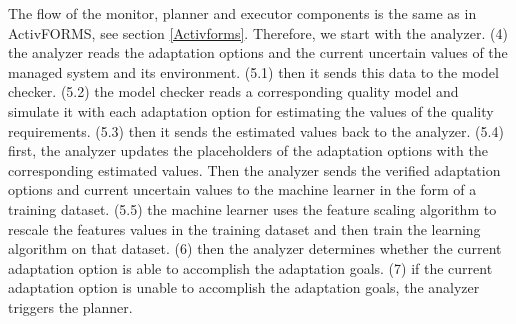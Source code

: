 \documentclass[a4paper,12pt]{article}
\begin{document}
The flow of the monitor, planner and executor components is the same as in ActivFORMS, see section \ref{Activforms}. Therefore, we start with the analyzer. (4) the analyzer reads the adaptation options and the current uncertain values of the managed system and its environment. (5.1) then it sends this data to the model checker. (5.2) the model checker reads a corresponding quality model and simulate it with each adaptation option for estimating the values of the quality requirements. (5.3) then it sends the estimated values back to the analyzer. (5.4) first, the analyzer updates the placeholders of the adaptation options with the corresponding estimated values. Then the analyzer sends the verified adaptation options and current uncertain values to the machine learner in the form of a training dataset. (5.5) the machine learner uses the feature scaling algorithm to rescale the features values in the training dataset and then train the learning algorithm on that dataset. (6) then the analyzer determines whether the current adaptation option is able to accomplish the adaptation goals. (7) if the current adaptation option is unable to accomplish the adaptation goals, the analyzer triggers the planner.
\end{document}
